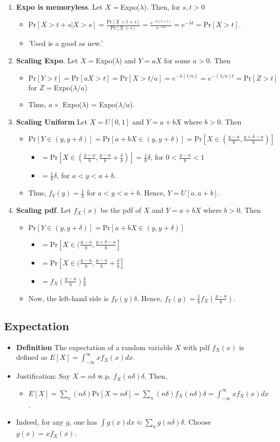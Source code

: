 \documentclass{article}
\newcommand{\pr}[1]{\textrm{Pr}[#1]}
\newcommand{\sumlim}[3]{\sum\limits_{#1}^{#2}#3}
\newcommand{\items}[1]{\begin{itemize}#1\end{itemize}}
\newcommand{\E}[1]{E[#1]}
\newcommand{\intlim}[2]{\int_{#1}^{#2}}
\begin{document}
\begin{enumerate}
	\item  \textbf{Expo is memoryless}. Let $X = $Expo($\lambda$). Then, for $s,t > 0$
	\items{
		\item $\pr{X > t +s | X > s} =\frac{\pr{X > t +s}}{\pr{X > s}}=\frac{e^{-\lambda(t+s)}}{e^{-\lambda s}} = e^{-\lambda t}= \pr{X > t}$.
		\item 'Used is a good as new.'
	}
	\item \textbf{Scaling Expo}. Let $X = $Expo($\lambda$) and $Y = aX$ for some $a > 0$. Then
	\items{
		\item $\pr{Y > t} = \pr{aX > t} = \pr{X > t/a}= e^{-\lambda(t/a)} = e^{-(\lambda /a)t} = \pr{Z > t}$ for $Z = $Expo($\lambda/a$)
		\item Thus, $a\times$ Expo($\lambda$) = Expo($\lambda /a$).
	}
	\item \textbf{Scaling Uniform} Let $X = U[0,1]$ and $Y = a+bX$ where $b > 0$. Then
	\items{
		\item $\pr{Y \in (y,y +\delta)} = \pr{a+bX \in (y,y +\delta)} = \pr{X \in (\frac{y-a}{b},\frac{y +\delta-a}{b})}$
		\items{
			\item $= \pr{X \in (\frac{y-a}{b},\frac{y-a}{b}+\frac{\delta}{b})} =\frac{1}{b}\delta$, for $0 <\frac{y-a}{b}< 1$
			\item $=\frac{1}{b}{\delta}$, for $a < y < a+b$.
		}
		\item Thus, $f_Y (y) = \frac{1}{b}$ for $a < y < a+b$. Hence, $Y = U[a,a+b]$.
	}
	\item \textbf{Scaling pdf}. Let $f_X (x)$ be the pdf of $X$ and $Y = a+bX$ where $b > 0$. Then
	\items{
		\item $\pr{Y \in (y,y +\delta)} = \pr{a+bX \in (y,y +\delta)}$
		\items{
			\item $= \pr{X \in (\frac{y-a}{b},\frac{y +\delta-a}{b}}$
			\item $= \pr{X \in (\frac{y-a}{b},\frac{y-a}{b}+\frac{\delta}{b}}$
			\item $= f_X (\frac{y-a}{b})\frac{\delta}{b}$
		}
		\item Now, the left-hand side is $f_Y (y)\delta$. Hence, $f_Y (y) =\frac{1}{b}f_X (\frac{y-a}{b})$.
	}
\end{enumerate}
\subsection*{Expectation}
\items{
	\item \textbf{Definition} The expectation of a random variable $X$ with pdf $f_X(x)$ is defined as $\E{X} =\intlim{-\infty}{\infty}xf_X (x)dx$.
	\item Justification: Say $X = n\delta$ w.p. $f_X (n\delta)\delta$. Then,
	\items{
		\item	$\E{X} = \sumlim{n}{}{(n\delta)\pr{X = n\delta}} = \sumlim{n}{}{(n\delta)f_X (n\delta)\delta} =\intlim{-\infty}{\infty}xf_X (x)dx$.
	}
	\item Indeed, for any $g$, one has $\int g(x)dx \approx \sumlim{n}{}{g(n\delta)\delta}$. Choose $g(x) = xf_X (x)$.
}
\end{document}
